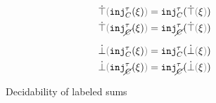 
\begin{figure}[ht]

  \begin{align*}
    \ctruify{\cinj{C}{\tau}{\xi}}     & = \cinj{C}{\tau}{\ctruify{\xi}}     \\
    \ctruify{\cinj{\notC}{\tau}{\xi}} & = \cinj{\notC}{\tau}{\ctruify{\xi}}
  \end{align*}


  \begin{align*}
    \cfalsify{\cinj{C}{\tau}{\xi}}     & = \cinj{C}{\tau}{\cfalsify{\xi}}     \\
    \cfalsify{\cinj{\notC}{\tau}{\xi}} & = \cinj{\notC}{\tau}{\cfalsify{\xi}}
  \end{align*}

  \judgbox{\cincon{\Xi}}{}

  \begin{mathpar}
  \end{mathpar}

  \caption{Decidability of labeled sums}
  \label{fig:labeled-sums-decidability}
\end{figure}
